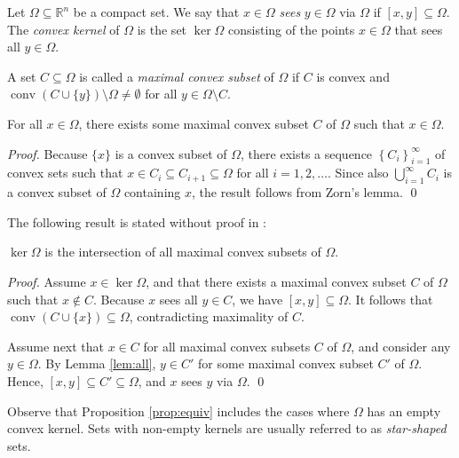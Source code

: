 \documentclass[smallcondensed]{svjour3}
\DeclareMathOperator*{\conv}{conv}
\begin{document}
\begin{definition} \label{def:sets}
Let $\Omega\subseteq\mathbb{R}^n$ be a compact set.
We say that $x\in\Omega$ \emph{sees} $y\in\Omega$ via $\Omega$ if $[x,y]\subseteq\Omega$.
The \emph{convex kernel} of $\Omega$ is the set $\ker\Omega$ consisting of the points $x\in\Omega$ that sees all $y\in\Omega$.
\end{definition}

A set $C\subseteq\Omega$ is called a \emph{maximal convex subset} of $\Omega$ if $C$ is convex and
$\conv\left(C\cup\{y\}\right)\setminus\Omega\neq\emptyset$ for all $y\in\Omega\setminus C$.

\begin{lemma} \label{lem:all}
For all $x\in\Omega$, there exists some maximal convex subset $C$ of $\Omega$ such that $x\in\Omega$.
\end{lemma}
\begin{proof}
Because $\{x\}$ is a convex subset of $\Omega$, there exists a sequence $\left\{C_i\right\}_{i=1}^{\infty}$ of convex sets such that
$x\in C_i\subseteq C_{i+1}\subseteq\Omega$ for all $i=1,2,\ldots$.
Since also $\bigcup_{i=1}^{\infty}C_i$ is a convex subset of $\Omega$ containing $x$, the result follows from Zorn's lemma.
\qed
\end{proof}

The following result is stated without proof in \cite{kenelly69}:
\begin{proposition} \label{prop:equiv}
$\ker\Omega$ is the intersection of all maximal convex subsets of $\Omega$.
\end{proposition}
\begin{proof}
Assume $x\in\ker\Omega$, and that there exists a maximal convex subset $C$ of $\Omega$ such that $x\not\in C$.
Because $x$ sees all $y\in C$, we have $[x,y]\subseteq\Omega$.
It follows that $\conv\left(C\cup\{x\}\right)\subseteq\Omega$, contradicting maximality of $C$.

Assume next that $x\in C$ for all maximal convex subsets $C$ of $\Omega$, and consider any $y\in\Omega$.
By Lemma \ref{lem:all}, $y\in C'$ for some maximal convex subset $C'$ of $\Omega$.
Hence, $[x,y]\subseteq C'\subseteq\Omega$, and $x$ sees $y$ via $\Omega$.
\qed
\end{proof}

Observe that Proposition \ref{prop:equiv} includes the cases where $\Omega$ has an empty convex kernel.
Sets with non-empty kernels are usually referred to as \emph{star-shaped} sets.
\end{document}
